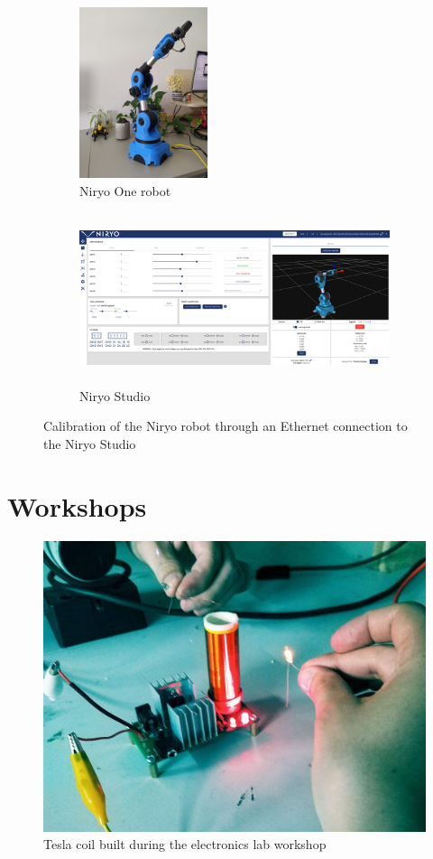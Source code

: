     \begin{figure}[ht]
        \centering
        \begin{subfigure}{.3\textwidth}
            \centering
            \includegraphics[height=5cm]{Images/07_niryo.jpeg}
            \caption{Niryo One robot}
            \label{fig:niryoRobot}
        \end{subfigure}%
        \begin{subfigure}{.7\textwidth}
            \centering
            \includegraphics[height=5cm]{Images/07_niryoStudio.png}
            \caption{Niryo Studio}
            \label{fig:niryoStudio}
        \end{subfigure}
        \caption{Calibration of the Niryo robot through an Ethernet connection to the Niryo Studio}
        \label{fig:calibration}
    \end{figure}

\section{Workshops}

    \begin{figure}[h]
        \centering
        \includegraphics[width=0.5\linewidth]{Images/07_tesla.jpeg}
        \caption{Tesla coil built during the electronics lab workshop}
        \label{fig:tesla}
    \end{figure}

